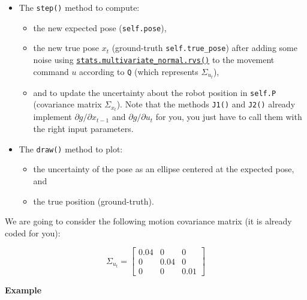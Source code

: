 \documentclass[11pt]{article}
\providecommand{\tightlist}{%
      \setlength{\itemsep}{0pt}\setlength{\parskip}{0pt}}
\begin{document}
\begin{itemize}
\tightlist
\item
  The \texttt{step()} method to compute:

  \begin{itemize}
  \tightlist
  \item
    the new expected pose (\texttt{self.pose}),
  \item
    the new true pose \(x_t\) (ground-truth \texttt{self.true\_pose})
    after adding some noise using
    \href{https://docs.scipy.org/doc/scipy/reference/generated/scipy.stats.multivariate_normal.html}{\texttt{stats.multivariate\_normal.rvs()}}
    to the movement command \(u\) according to \texttt{Q} (which
    represents \(\Sigma_{u_t}\)),
  \item
    and to update the uncertainty about the robot position in
    \texttt{self.P} (covariance matrix \(\Sigma_{x_t}\)). Note that the
    methods \texttt{J1()} and \texttt{J2()} already implement
    \(\partial g / \partial x_{t-1}\) and
    \(\partial g / \partial u_{t}\) for you, you just have to call them
    with the right input parameters.
  \end{itemize}
\item
  The \texttt{draw()} method to plot:

  \begin{itemize}
  \tightlist
  \item
    the uncertainty of the pose as an ellipse centered at the expected
    pose, and
  \item
    the true position (ground-truth).
  \end{itemize}
\end{itemize}

We are going to consider the following motion covariance matrix (it is
already coded for you):

\[
    \Sigma_{u_t} = \begin{bmatrix}
        0.04 & 0 & 0 \\
        0 & 0.04 & 0 \\
        0 & 0 & 0.01
    \end{bmatrix}
\]

\textbf{Example}
\end{document}
